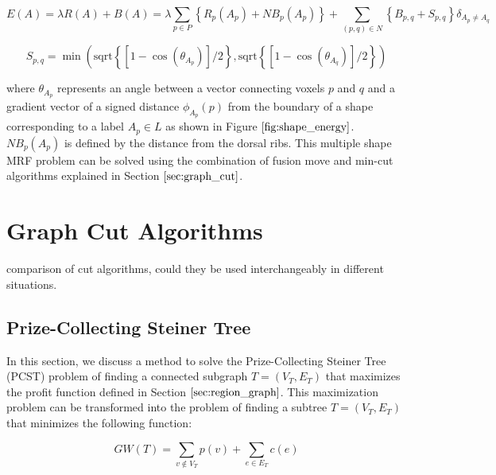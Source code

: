 \documentclass{SMBV12}
\begin{document}
\begin{equation}
E(A) = \lambda R(A) + B(A) = \lambda \sum_{p \in P} \left\lbrace  R_p(A_p) + NB_p(A_p) \right\rbrace + \sum_{(p, q) \in N} \left\lbrace B_{p, q} + S_{p, q} \right\rbrace \delta_{A_p \neq A_q}
\end{equation}

\begin{equation}
S_{p, q} = \min(\mathrm{sqrt}\left\lbrace [1 - \cos(\theta_{A_p})]/2 \right\rbrace, \mathrm{sqrt}\left\lbrace [1 - \cos(\theta_{A_q})]/2 \right\rbrace )
\end{equation}

where $\theta_{A_p}$ represents an angle between a vector connecting voxels $p$ and $q$ and a gradient vector of a signed distance $\phi_{A_p}(p)$ from the boundary of a shape corresponding to a label $A_p \in L$ as shown in Figure $\ref{fig:shape_energy}$. $NB_p(A_p)$ is defined by the distance from the dorsal ribs. This multiple shape MRF problem can be solved using the combination of fusion move and min-cut algorithms explained in Section $\ref{sec:graph_cut}$.

\section{Graph Cut Algorithms}

comparison of cut algorithms, could they be used interchangeably in different situations.

\subsection{Prize-Collecting Steiner Tree}
\label{sec:branch_and_cut}

In this section, we discuss a method to solve the Prize-Collecting Steiner Tree (PCST) problem \cite{ljubic2006algorithmic} of finding a connected subgraph $T = (V_T, E_T)$ that maximizes the profit function defined in Section $\ref{sec:region_graph}$. This maximization problem can be transformed into the problem of finding a subtree $T = (V_T, E_T)$ that minimizes the following function:

\begin{equation}
GW(T) = \sum\limits_{v \notin V_T} p(v) + \sum\limits_{e \in E_T} c(e)
\end{equation}
\end{document}
